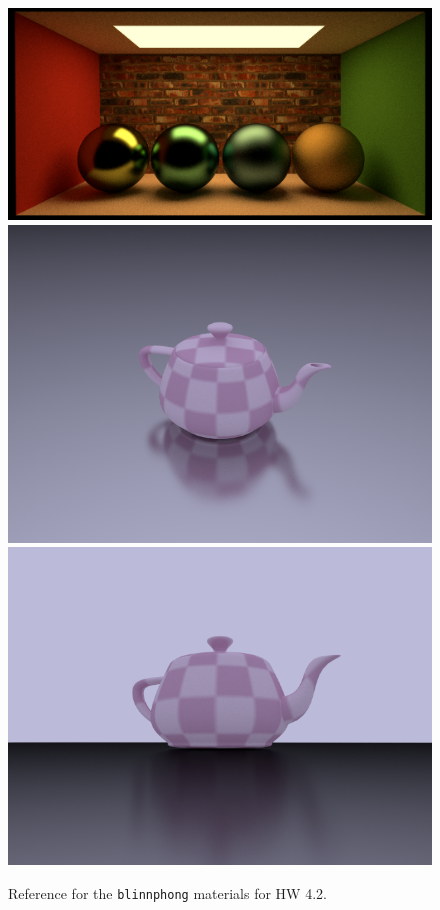 \begin{figure}[ht]
    \centering
    \includegraphics[width=0.45\linewidth]{imgs/hw_4_2f.png}
    \includegraphics[width=0.225\linewidth]{imgs/hw_4_2g.png}
    \includegraphics[width=0.225\linewidth]{imgs/hw_4_2h.png}
    \caption{Reference for the \lstinline{blinnphong} materials for HW 4.2.}
    \label{fig:hw_4_2_blinn}
\end{figure}

